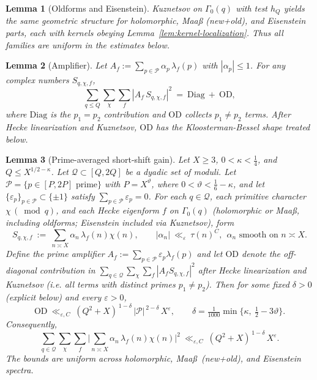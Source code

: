 \documentclass[11pt]{article}
\newtheorem{lemma}{Lemma}[part]
\theoremstyle{definition}
\theoremstyle{remark}
\numberwithin{equation}{part}
\begin{document}
\begin{lemma}[Oldforms and Eisenstein]\label{lem:old-eis}
	Kuznetsov on $\Gamma_0(q)$ with test $h_Q$ yields the same geometric structure for holomorphic, Maaß (new+old), and Eisenstein parts, each with kernels obeying Lemma~\ref{lem:kernel-localization}. Thus all families are uniform in the estimates below.
\end{lemma}

\begin{lemma}[Amplifier]\label{lem:amplifier}
	Let $A_f:=\sum_{p\in\mathcal P}\alpha_p\,\lambda_f(p)$ with $|\alpha_p|\le 1$. For any complex numbers $S_{q,\chi,f}$,
	\[
		\sum_{q\le Q}\sum_{\chi}\sum_f |A_f\,S_{q,\chi,f}|^2
		\ =\ \mathrm{Diag}\ +\ \mathrm{OD},
	\]
	where $\mathrm{Diag}$ is the $p_1=p_2$ contribution and $\mathrm{OD}$ collects $p_1\ne p_2$ terms. After Hecke linearization and Kuznetsov, $\mathrm{OD}$ has the Kloosterman-Bessel shape treated below.
\end{lemma}

\begin{lemma}[Prime-averaged short-shift gain]\label{lem:S2.4}
	Let $X\ge3$, $0<\kappa<\tfrac14$, and $Q\le X^{1/2-\kappa}$. Let $\mathcal Q\subset[Q,2Q]$ be a dyadic set of moduli.
	Let $\mathcal P=\{p\in[P,2P]\text{ prime}\}$ with $P=X^\vartheta$, where $0<\vartheta<\tfrac16-\kappa$, and let $\{\varepsilon_p\}_{p\in\mathcal P}\subset\{\pm1\}$ satisfy $\sum_{p\in\mathcal P}\varepsilon_p=0$. For each $q\in\mathcal Q$, each primitive character $\chi\,(\bmod q)$, and each Hecke eigenform $f$ on $\Gamma_0(q)$ (holomorphic or Maa\ss, including oldforms; Eisenstein included via Kuznetsov), form
	\[
		S_{q,\chi,f} \ :=\ \sum_{n\asymp X}\alpha_n\,\lambda_f(n)\chi(n),
		\qquad
		|\alpha_n|\ \ll_\varepsilon\ \tau(n)^C,\ \ \text{$\alpha_n$ smooth on $n\asymp X$}.
	\]
	Define the prime amplifier $A_f:=\sum_{p\in\mathcal P}\varepsilon_p\lambda_f(p)$ and let $\mathrm{OD}$ denote the off-diagonal contribution in $\sum_{q\in\mathcal Q}\sum_{\chi}\sum_f |A_f S_{q,\chi,f}|^2$ after Hecke linearization and Kuznetsov (i.e. all terms with distinct primes $p_1\ne p_2$).
	Then for some fixed $\delta>0$ (explicit below) and every $\varepsilon>0$,
	\[
		\mathrm{OD}\ \ll_{\varepsilon,C}\ (Q^2+X)^{\,1-\delta}\,|\mathcal P|^{\,2-\delta}\,X^{\varepsilon},
		\qquad
		\delta=\tfrac1{1000}\min\Big\{\kappa,\ \tfrac12-3\vartheta\Big\}.
	\]
	Consequently,
	\[
		\sum_{q\in\mathcal Q}\sum_{\chi}\sum_f \Big|\sum_{n\asymp X}\alpha_n\,\lambda_f(n)\chi(n)\Big|^2
		\ \ll_{\varepsilon,C}\ (Q^2+X)^{\,1-\delta}\,X^{\varepsilon}.
	\]
	The bounds are uniform across holomorphic, Maa\ss\ (new+old), and Eisenstein spectra.
\end{lemma}
\end{document}
